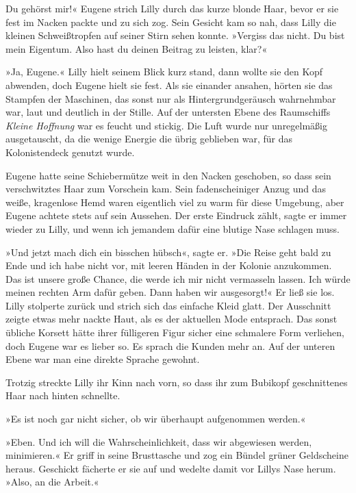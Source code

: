 Du gehörst mir!« Eugene strich Lilly durch das kurze blonde Haar,
bevor er sie fest im Nacken packte und zu sich zog. Sein Gesicht
kam so nah, dass Lilly die kleinen Schweißtropfen auf seiner Stirn
sehen konnte. »Vergiss das nicht. Du bist mein Eigentum. Also hast
du deinen Beitrag zu leisten, klar?«

»Ja, Eugene.« Lilly hielt seinem Blick kurz stand, dann wollte sie
den Kopf abwenden, doch Eugene hielt sie fest. Als sie einander
ansahen, hörten sie das Stampfen der Maschinen, das sonst nur als
Hintergrundgeräusch wahrnehmbar war, laut und deutlich in der
Stille. Auf der untersten Ebene des Raumschiffs \textit{Kleine Hoffnung} war
es feucht und stickig. Die Luft wurde nur unregelmäßig
ausgetauscht, da die wenige Energie die übrig geblieben war, für
das Kolonistendeck genutzt wurde.

Eugene hatte seine Schiebermütze weit in den Nacken geschoben, so
dass sein verschwitztes Haar zum Vorschein kam. Sein
fadenscheiniger Anzug und das weiße, kragenlose Hemd waren
eigentlich viel zu warm für diese Umgebung, aber Eugene achtete
stets auf sein Aussehen. Der erste Eindruck zählt, sagte er immer
wieder zu Lilly, und wenn ich jemandem dafür eine blutige Nase
schlagen muss.

»Und jetzt mach dich ein bisschen hübsch«, sagte er. »Die Reise
geht bald zu Ende und ich habe nicht vor, mit leeren Händen in der
Kolonie anzukommen. Das ist unsere große Chance, die werde ich mir
nicht vermasseln lassen. Ich würde meinen rechten Arm dafür geben.
Dann haben wir ausgesorgt!« Er ließ sie los. Lilly stolperte zurück
und strich sich das einfache Kleid glatt. Der Ausschnitt zeigte
etwas mehr nackte Haut, als es der aktuellen Mode entsprach. Das
sonst übliche Korsett hätte ihrer fülligeren Figur sicher eine
schmalere Form verliehen, doch Eugene war es lieber so. Es sprach
die Kunden mehr an. Auf der unteren Ebene war man eine direkte
Sprache gewohnt.

Trotzig streckte Lilly ihr Kinn nach vorn, so dass ihr zum Bubikopf
geschnittenes Haar nach hinten schnellte.

»Es ist noch gar nicht sicher, ob wir überhaupt aufgenommen
werden.«

»Eben. Und ich will die Wahrscheinlichkeit, dass wir abgewiesen
werden, minimieren.« Er griff in seine Brusttasche und zog ein
Bündel grüner Geldscheine heraus. Geschickt fächerte er sie auf und
wedelte damit vor Lillys Nase herum. »Also, an die Arbeit.«

\tb

